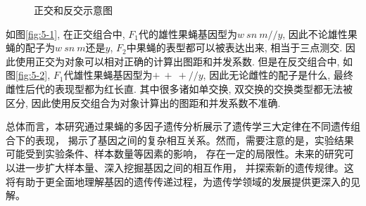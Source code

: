 \documentclass[AutoFakeBold]{LZUThesis}
\begin{document}
\begin{figure}
    \centering
    \hfill
    \centering
    \label{fig:5}
    \caption{正交和反交示意图}
\end{figure}

如图\ref{fig:5-1}, 在正交组合中, $F_1$代的雄性果蝇基因型为$w~sn~m//y$, 因此不论雄性果蝇的配子为$w~sn~m$还是$y$,
$F_2$中果蝇的表型都可以被表达出来, 相当于三点测交. 因此使用正交为对象可以相对正确的计算出图距和并发系数.
但是在反交组合中, 如图\ref{fig:5-2}, $F_1$代雄性果蝇基因型为$+~+~+//y$, 因此无论雌性的配子是什么, 
最终雌性后代的表现型都为红长直. 其中很多诸如单交换, 双交换的交换类型都无法被区分, 因此使用反交组合为对象计算出的图距和并发系数不准确.\par

总体而言，本研究通过果蝇的多因子遗传分析展示了遗传学三大定律在不同遗传组合下的表现，
揭示了基因之间的复杂相互关系。然而，需要注意的是，实验结果可能受到实验条件、样本数量等因素的影响，
存在一定的局限性。未来的研究可以进一步扩大样本量、深入挖掘基因之间的相互作用，
并探索新的遗传规律。这将有助于更全面地理解基因的遗传传递过程，为遗传学领域的发展提供更深入的见解。\par
\end{document}
